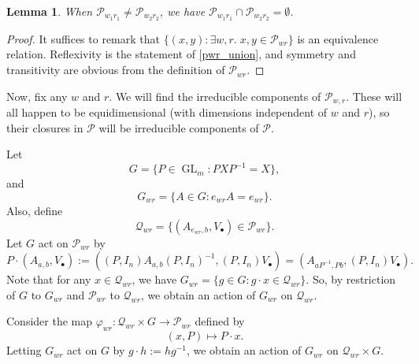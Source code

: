 \documentclass[12pt,psamsfonts]{article}
\DeclareMathOperator{\GL}{GL}
\newtheorem{lemma}[theorem]{Lemma}
\begin{document}
\begin{lemma}
    When \(\mathcal{P}_{w_1r_1} \neq \mathcal{P}_{w_2r_2}\), we have \(\mathcal{P}_{w_1r_1} \cap \mathcal{P}_{w_2r_2} = \emptyset\). 
\end{lemma}
\begin{proof}
    It suffices to remark that \(\{(x,y) : \exists w,r. \; x,y \in \mathcal{P}_{wr}\}\) is an equivalence relation.
    Reflexivity is the statement of \cref{pwr_union}, and symmetry and transitivity are obvious from the definition of \(\mathcal{P}_{wr}\).
\end{proof}

Now, fix any \(w\) and \(r\).
We will find the irreducible components of \(\mathcal{P}_{w,r}\).
These will all happen to be equidimensional (with dimensions independent of \(w\) and \(r\)), so their closures in \(\mathcal{P}\) will be irreducible components of \(\mathcal{P}\).
\par Let 
\[G = \{P \in \GL_m : P X P^{-1} = X\},\]
and
\[G_{wr} = \{A \in G : e_{wr}A = e_{wr}\}.\]
Also, define 
\[\mathcal{Q}_{wr} = \{(A_{e_{wr}, b}, V_\bullet) \in \mathcal{P}_{wr}\}.\]
Let \(G\) act on \(\mathcal{P}_{wr}\) by
\[P \cdot (A_{a,b}, V_\bullet) := ((P, I_n) A_{a, b} (P, I_n)^{-1}, (P, I_n)V_\bullet) = (A_{a P^{-1}, Pb}, (P, I_n) V_\bullet).\]
Note that for any \(x \in \mathcal{Q}_{wr}\), we have \(G_{wr} = \{g \in G : g \cdot x \in \mathcal{Q}_{wr}\}\).
So, by restriction of \(G\) to \(G_{wr}\) and \(\mathcal{P}_{wr}\) to \(\mathcal{Q}_{wr}\), we obtain an action of \(G_{wr}\) on \(\mathcal{Q}_{wr}\).
\par Consider the map \(\varphi_{wr} : \mathcal{Q}_{wr} \times G \to \mathcal{P}_{wr}\) defined by
\[(x, P) \mapsto P \cdot x.\]
Letting \(G_{wr}\) act on \(G\) by \(g \cdot h := hg^{-1}\), we obtain an action of \(G_{wr}\) on \(\mathcal{Q}_{wr} \times G\).
\end{document}
